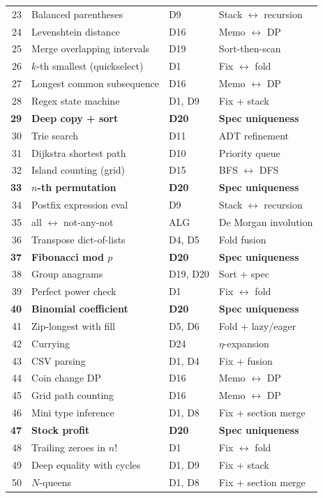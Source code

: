 \documentclass[11pt,a4paper]{report}
\theoremstyle{definition}
\theoremstyle{plain}
\begin{document}
\begin{center}
\begin{tabular}{r l l l}
  23 & Balanced parentheses & D9 & Stack $\leftrightarrow$ recursion \\
  24 & Levenshtein distance & D16 & Memo $\leftrightarrow$ DP \\
  25 & Merge overlapping intervals & D19 & Sort-then-scan \\
  26 & $k$-th smallest (quickselect) & D1 & Fix $\leftrightarrow$ fold \\
  27 & Longest common subsequence & D16 & Memo $\leftrightarrow$ DP \\
  28 & Regex state machine & D1, D9 & Fix + stack \\
  \textbf{29} & \textbf{Deep copy + sort} & \textbf{D20} &
    \textbf{Spec uniqueness} \\
  30 & Trie search & D11 & ADT refinement \\
  31 & Dijkstra shortest path & D10 & Priority queue \\
  32 & Island counting (grid) & D15 & BFS $\leftrightarrow$ DFS \\
  \textbf{33} & \textbf{$n$-th permutation} & \textbf{D20} &
    \textbf{Spec uniqueness} \\
  34 & Postfix expression eval & D9 & Stack $\leftrightarrow$ recursion \\
  35 & all $\leftrightarrow$ not-any-not & ALG & De Morgan involution \\
  36 & Transpose dict-of-lists & D4, D5 & Fold fusion \\
  \textbf{37} & \textbf{Fibonacci mod $p$} & \textbf{D20} &
    \textbf{Spec uniqueness} \\
  38 & Group anagrams & D19, D20 & Sort + spec \\
  39 & Perfect power check & D1 & Fix $\leftrightarrow$ fold \\
  \textbf{40} & \textbf{Binomial coefficient} & \textbf{D20} &
    \textbf{Spec uniqueness} \\
  41 & Zip-longest with fill & D5, D6 & Fold + lazy/eager \\
  42 & Currying & D24 & $\eta$-expansion \\
  43 & CSV parsing & D1, D4 & Fix + fusion \\
  44 & Coin change DP & D16 & Memo $\leftrightarrow$ DP \\
  45 & Grid path counting & D16 & Memo $\leftrightarrow$ DP \\
  46 & Mini type inference & D1, D8 & Fix + section merge \\
  \textbf{47} & \textbf{Stock profit} & \textbf{D20} &
    \textbf{Spec uniqueness} \\
  48 & Trailing zeroes in $n!$ & D1 & Fix $\leftrightarrow$ fold \\
  49 & Deep equality with cycles & D1, D9 & Fix + stack \\
  50 & $N$-queens & D1, D8 & Fix + section merge \\
\end{tabular}
\end{center}
\end{document}
